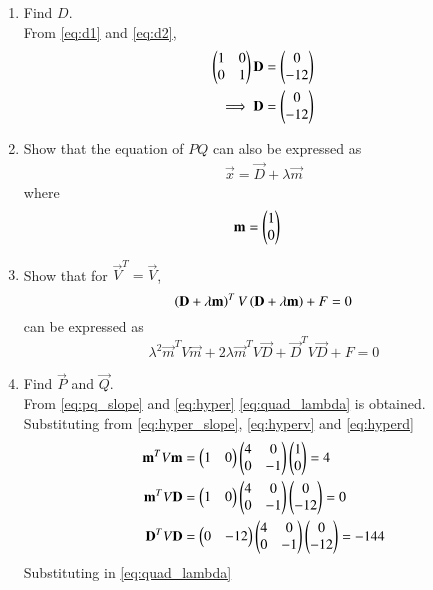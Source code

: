 \documentclass[journal,12pt,twocolumn]{IEEEtran}
\renewcommand\thesection{\arabic{section}}
\begin{document}
\begin{enumerate}[label=\thesection.\arabic*
,ref=\thesection.\theenumi]
\begin{align}
\implies \myvec{1 & 0}\vec{x} &= 0
\label{eq:d2}
\end{align}
%
\item Find $D$.
\\
\solution
From \eqref{eq:d1} and \eqref{eq:d2},
\begin{align}
 \begin{pmatrix}1 & 0 \\ 0 &  1\end{pmatrix}\mathbf{D} &= \begin{pmatrix}0 \\ -12 \end{pmatrix}
\\
\implies  \mathbf{D} &= \begin{pmatrix}0 \\ -12 \end{pmatrix}
\label{eq:hyperd}
\end{align}
%
\item Show that the equation of $PQ$ can also be expressed as
\begin{align}
\label{eq:pq_slope}
\vec{x} = \vec{D}+\lambda \vec{m}
\end{align}
where
\begin{align}
\mathbf{m} &=   \begin{pmatrix}1 \\ 0\end{pmatrix}
\label{eq:hyper_slope}
\end{align}
%
\item Show that for $\vec{V}^T = \vec{V}$,
\begin{equation}
\label{eq:quad_md}
\left(\mathbf{D}+\lambda\mathbf{m}\right)^TV\left(\mathbf{D}+\lambda\mathbf{m}\right) + F= 0 
\end{equation}
can be expressed as
\begin{equation}
\label{eq:quad_lambda}
\lambda^2\vec{m}^TV\vec{m}+2\lambda\vec{m}^TV\vec{D}+\vec{D}^TV\vec{D}
+ F = 0
\end{equation}
%
\item Find $\vec{P}$ and $\vec{Q}$.
\\
\solution From \eqref{eq:pq_slope} and \eqref{eq:hyper} \eqref{eq:quad_lambda} is obtained.
%
Substituting from \eqref{eq:hyper_slope}, \eqref{eq:hyperv} and \eqref{eq:hyperd}
\begin{align}
\mathbf{m}^TV\mathbf{m} &= \begin{pmatrix}1& 0\end{pmatrix} \begin{pmatrix}4 & 0 \\ 0 & -1\end{pmatrix}\begin{pmatrix}1 \\ 0\end{pmatrix} = 4
\\
\mathbf{m}^TV\mathbf{D} & = \begin{pmatrix}1& 0\end{pmatrix}\begin{pmatrix}4 & 0 \\ 0 & -1\end{pmatrix}\begin{pmatrix}0 \\ -12 \end{pmatrix} = 0
\\
\mathbf{D}^TV\mathbf{D} &= \begin{pmatrix}0 & -12 \end{pmatrix}\begin{pmatrix}4 & 0 \\ 0 & -1\end{pmatrix}\begin{pmatrix}0 \\ -12 \end{pmatrix} = -144
\end{align}
%
Substituting in \eqref{eq:quad_lambda}

\end{enumerate}
\end{document}

